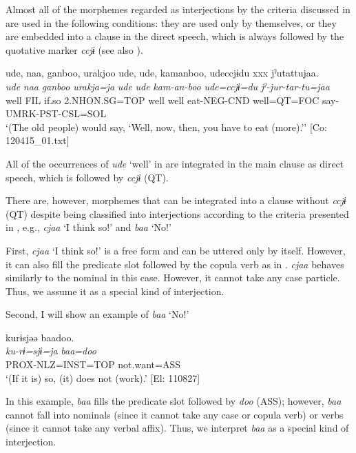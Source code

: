   Almost all of the morphemes regarded as interjections by the criteria discussed in  are used in the following conditions: they are used only by themselves, or they are embedded into a clause in the direct speech, which is always followed by the quotative marker \textit{ccjɨ} (see also ).

\ea{} \label{ex:4.57}
\glll   ude,  naa,  ganboo,  urakjoo  ude,  ude,  kamanboo,   udeccjɨdu  xxx  jˀutattujaa.\\
    \textit{ude}  \textit{naa}  \textit{ganboo}  \textit{urakja=ja}  \textit{ude}  \textit{ude}  \textit{kam-an-boo}   \textit{ude=ccjɨ=du}    \textit{jˀ-jur-tar-tu=jaa}\\
    well  FIL  if.so  2.NHON.SG=TOP  well  well  eat-NEG-CND                                                            well=QT=FOC    say-UMRK-PST-CSL=SOL\\
  \glt     ‘(The old people) would say, ‘Well, now, then, you have to eat (more).’’ [Co: 120415\_01.txt]
  \z

All of the occurrences of \textit{ude} ‘well’ in  are integrated in the main clause as direct speech, which is followed by \textit{ccjɨ} (QT).

There are, however, morphemes that can be integrated into a clause without \textit{ccjɨ} (QT) despite being classified into interjections according to the criteria presented in , e.g., \textit{cjaa} ‘I think so!’ and \textit{baa} ‘No!’

First, \textit{cjaa} ‘I think so!’ is a free form and can be uttered only by itself. However, it can also fill the predicate slot followed by the copula verb as in . \textit{cjaa} behaves similarly to the nominal in this case. However, it cannot take any case particle. Thus, we assume it as a special kind of interjection.  

Second, I will show an example of \textit{baa} ‘No!’

\ea \label{ex:4.58}
\glll    kurɨsjəə  baadoo.\\
    \textit{ku-rɨ=sjɨ=ja}  \textit{baa=doo}\\
    PROX-NLZ=INST=TOP  not.want=ASS\\
  \glt     ‘(If it is) so, (it) does not (work).’ [El: 110827]
\z

In this example, \textit{baa} fills the predicate slot followed by \textit{doo} (ASS); however, \textit{baa} cannot fall into nominals (since it cannot take any case or copula verb) or verbs (since it cannot take any verbal affix). Thus, we interpret \textit{baa} as a special kind of interjection.

